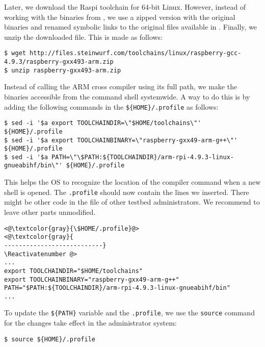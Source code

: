 Later, we download the \ac{Raspi} toolchain for 64-bit Linux. However,
instead of working with the binaries from \cite{2016rpitoolchain},
we use a zipped version with the original binaries and renamed symbolic
links to the original files available in
\cite{2016steinwurfrpitoolchain}. Finally, we unzip the downloaded file.
This is made as follows:

\begin{lstlisting}[]
$ wget http://files.steinwurf.com/toolchains/linux/raspberry-gcc-4.9.3/raspberry-gxx493-arm.zip
$ unzip raspberry-gxx493-arm.zip
\end{lstlisting}
\FloatBarrier
\vspace{-5mm}

Instead of calling the ARM cross compiler using its full path, we make
the binaries accessible from the command shell systemwide. A way to do
this is by adding the following commands in the \texttt{\$\{HOME\}/.profile}
as follows:

\begin{lstlisting}[]
$ sed -i '$a export TOOLCHAINDIR=\"$HOME/toolchains\"' ${HOME}/.profile
$ sed -i '$a export TOOLCHAINBINARY=\"raspberry-gxx49-arm-g++\"' ${HOME}/.profile
$ sed -i '$a PATH=\"\$PATH:${TOOLCHAINDIR}/arm-rpi-4.9.3-linux-gnueabihf/bin\"' ${HOME}/.profile
\end{lstlisting}
\FloatBarrier
\vspace{-5mm}

This helps the \ac{OS} to recognize the location of the compiler
command when a new shell is opened. The \texttt{.profile} should now
contain the lines we inserted. There might be other
code in the file of other testbed administrators. We recommend to leave
other parts unmodified.
\Suppressnumber\begin{lstlisting}[]
<@\textcolor{gray}{\$HOME/.profile}@>
<@\textcolor{gray}{
---------------------------}
\Reactivatenumber @>
...
export TOOLCHAINDIR="$HOME/toolchains"
export TOOLCHAINBINARY="raspberry-gxx49-arm-g++"
PATH="$PATH:${TOOLCHAINDIR}/arm-rpi-4.9.3-linux-gnueabihf/bin"
...
\end{lstlisting}
\FloatBarrier
\vspace{-5mm}

To update the \texttt{\$\{PATH\}} variable and the \texttt{.profile}, we
use the \texttt{source} command for the changes take effect in the
administrator system:
\begin{lstlisting}[]
$ source ${HOME}/.profile
\end{lstlisting}
\FloatBarrier
\vspace{-5mm}

